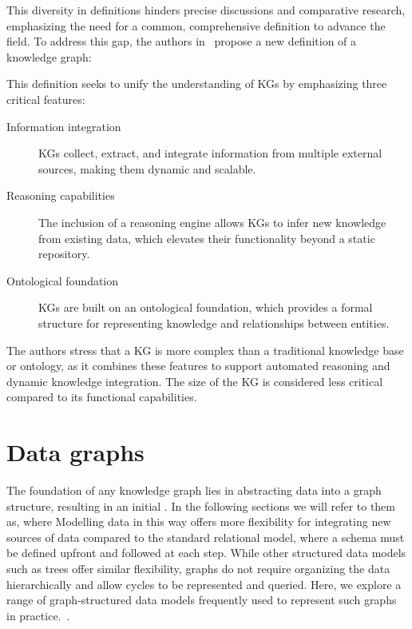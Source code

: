 This diversity in definitions hinders precise discussions and comparative research, emphasizing the need for a common, comprehensive definition to advance the field. To address this gap, the authors in~\cite{Ehrlinger2016TowardsAD} propose a new definition of a knowledge graph: 
\begin{center}
    \begin{quote}
    \end{quote}
\end{center}
This definition seeks to unify the understanding of KGs by emphasizing three critical features:
\begin{description}
    \item[Information integration] KGs collect, extract, and integrate information from multiple external sources, making them dynamic and scalable.
    \item[Reasoning capabilities] The inclusion of a reasoning engine allows KGs to infer new knowledge from existing data, which elevates their functionality beyond a static repository.
    \item[Ontological foundation] KGs are built on an ontological foundation, which provides a formal structure for representing knowledge and relationships between entities. 
\end{description}

The authors stress that a KG is more complex than a traditional knowledge base or ontology, as it combines these features to support automated reasoning and dynamic knowledge integration. The size of the KG is considered less critical compared to its functional capabilities.

\section{Data graphs}\label{data-graphs}
The foundation of any knowledge graph lies in abstracting data into a graph structure, resulting in an initial . In the following sections we will refer to them as, where Modelling data in this way offers more flexibility for integrating new sources of data compared to the standard relational model, where a schema must be defined upfront and followed at each step. While other structured data models such as trees offer similar flexibility, graphs do not require organizing the data hierarchically and allow cycles to be represented and queried. Here, we explore a range of graph-structured data models frequently used to represent such graphs in practice.~\cite{Hogan2021KGs}. 

